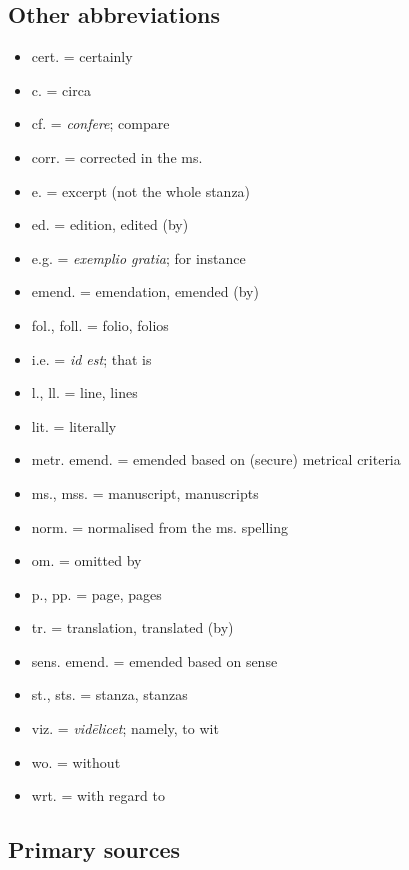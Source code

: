 \subsection{Other abbreviations}
\begin{itemize}%
	\item cert. = certainly
	\item c. = circa
	\item cf. = \emph{confere}; compare
	\item corr. = corrected in the ms.
	\item e. = excerpt (not the whole stanza)
	\item ed. = edition, edited (by)
	\item e.g. = \emph{exemplio gratia}; for instance
	\item emend. = emendation, emended (by)
	\item fol., foll. = folio, folios
	\item i.e. = \emph{id est}; that is
	\item l., ll. = line, lines
	\item lit. = literally
	\item metr. emend. = emended based on (secure) metrical criteria
	\item ms., mss. = manuscript, manuscripts
	\item norm. = normalised from the ms. spelling
	\item om. = omitted by
	\item p., pp. = page, pages
	\item tr. = translation, translated (by)
	\item sens. emend. = emended based on sense
	\item st., sts. = stanza, stanzas
	\item viz. = \emph{vidēlicet}; namely, to wit
	\item wo. = without
	\item wrt. = with regard to
\end{itemize}

\subsection{Primary sources}

\newcommand{\Allvismal}{%
	\emph{Alv}%
}
\newcommand{\Atlakvida}{%
	\emph{Akv}%
}
\newcommand{\Atlamal}{%
	\emph{Am}%
}
\newcommand{\Baldrsdraumar}{%
	\emph{Bdr}%
}
\newcommand{\Beowulf}{%
	\emph{Beow}%
}
\newcommand{\Brot}{%
	\emph{Brot}%
}
\newcommand{\Deor}{%
	\emph{Deer}%
}
\newcommand{\EyrbyggjaSaga}{%
	\emph{Eb}%
}
\newcommand{\EgilsSaga}{%
	\emph{Eg}%
}
\newcommand{\Fafnismal}{%
	\emph{Fáfn}%
}
\newcommand{\FostrbroedhraSaga}{%
	\emph{FbrS}%
}

